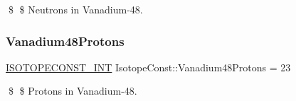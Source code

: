 \$ \$ Neutrons in Vanadium-\/48. \mbox{\label{group___isotope_const-_vanadium-_v48_ga1f56ffb1a5c29924818f1b53f1c60b5d}} 
\subsubsection{\texorpdfstring{Vanadium48\+Protons}{Vanadium48Protons}}
{\footnotesize\ttfamily \mbox{\hyperlink{group___isotope_const-_macros_ga5f18360b3e99483a35c32d789e62621c}{I\+S\+O\+T\+O\+P\+E\+C\+O\+N\+S\+T\+\_\+\+I\+NT}} Isotope\+Const\+::\+Vanadium48\+Protons = 23}

\$ \$ Protons in Vanadium-\/48. 